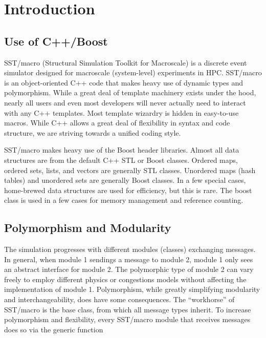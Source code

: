 
\chapter{Introduction}

\section{Use of C++/Boost}
SST/macro (Structural Simulation Toolkit for Macroscale) is a discrete event simulator designed for macroscale (system-level) experiments in HPC. 
SST/macro is an object-oriented C++ code that makes heavy use of dynamic types and polymorphism.
While a great deal of template machinery exists under the hood, nearly all users and even most developers will never actually need to interact with any C++ templates.
Most template wizardry is hidden in easy-to-use macros.
While C++ allows a great deal of flexibility in syntax and code structure, we are striving towards a unified coding style.

SST/macro makes heavy use of the Boost header libraries.
Almost all data structures are from the default C++ STL or Boost classes.  
Ordered maps, ordered sets, lists, and vectors are generally STL classes.
Unordered maps (hash tables) and unordered sets are generally Boost classes.
In a few special cases, home-brewed data structures are used for efficiency, but this is rare.
The boost  class is used in a few cases for memory management and reference counting.

\section{Polymorphism and Modularity}
The simulation progresses with different modules (classes) exchanging messages.
In general, when module 1 sendings a message to module 2, module 1 only sees an abstract interface for module 2.
The polymorphic type of module 2 can vary freely to employ different physics or congestions models without affecting the implementation of module 1. 
Polymorphism, while greatly simplifying modularity and interchangeability, does have some consequences.
The ``workhorse'' of SST/macro is the base  class, from which all message types inherit.
To increase polymorphism and flexibility, every SST/macro module that receives messages does so via the generic function

